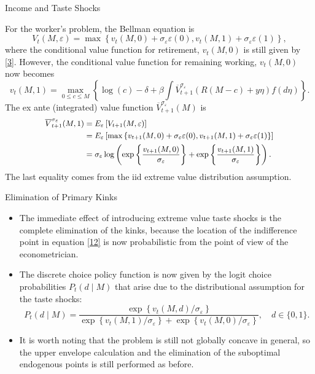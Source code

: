 \documentclass[aspectratio=169]{beamer}
\newcommand{\highlight}[1]{{\color{blue}{#1}}}
\begin{document}
\begin{frame}{Income and Taste Shocks}

	For the worker's problem, the Bellman equation is 
	\begin{equation}
		\label{12}
		V_t(M, \varepsilon)=\max \left\{v_t(M, 0)+\sigma_{\varepsilon} \varepsilon(0), v_t(M, 1)+\sigma_{\varepsilon} \varepsilon(1)\right\},
	\end{equation}
	where the conditional value function for retirement, $v_t(M,0)$ is still given by \ref{3}. However, the conditional value function for remaining working, $v_t(M,0)$ now becomes
	\begin{equation}
		\label{13}
		v_t(M, 1)=\max _{0 \leq c \leq M}\left\{\log (c)-\delta+\beta \int \overline{V}_{t+1}^{\sigma_{\varepsilon}}(R(M-c)+y \eta) f(d \eta)\right\}.
	\end{equation}
	The ex ante (integrated) value function $\overline{V}_{t+1}^{\sigma_{\varepsilon}}(M)$ is 
	\begin{equation}\small
		\label{14}
		\begin{aligned}
			\overline{V}_{t+1}^{\sigma_{\varepsilon}}(M, 1) & = E_{\varepsilon} \left[ V_{t+1} (M, \varepsilon) \right] \\
			& = E_{\varepsilon} \left[\max \left\{v_{t+1}(M, 0)+\sigma_{\varepsilon} \varepsilon(0), v_{t+1}(M, 1)+\sigma_{\varepsilon} \varepsilon(1)\right\}\right] \\
			& =\sigma_{\varepsilon} \log \left(\exp \left\{\frac{v_{t+1}(M, 0)}{\sigma_{\varepsilon}}  \right\}+\exp \left\{\frac{v_{t+1}(M, 1)}{\sigma_{\varepsilon}}\right\}\right) .
		\end{aligned}
	\end{equation}
	The last equality comes from the iid extreme value distribution assumption.
\end{frame}

\begin{frame}{Elimination of Primary Kinks}
	\begin{itemize}
		\item The immediate effect of introducing extreme value taste shocks is the complete elimination of the \highlight{primary} kinks, because the location of the indifference point in equation \ref{12} is now probabilistic from the point of view of the econometrician.
		\item The discrete choice policy function is now given by the logit choice probabilities $P_t(d \mid M)$ that arise due to the distributional assumption for the taste shocks:
		\begin{equation}
			\label{15}
			P_t(d \mid M)=\frac{\exp \left\{v_t(M, d) / \sigma_{\varepsilon}\right\}}{\exp \left\{v_t(M, 1) / \sigma_{\varepsilon}\right\}+\exp \left\{v_t(M, 0) / \sigma_{\varepsilon}\right\}}, \quad d \in\{0,1\} .
		\end{equation}
		
		\item It is worth noting that the problem is still not globally concave in general, so the upper envelope calculation and the elimination of the suboptimal endogenous points is still performed as before.
	\end{itemize}
\end{frame}
\end{document}

